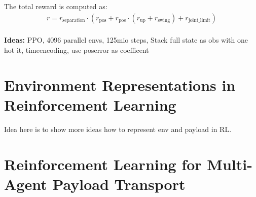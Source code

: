 The total reward is computed as:
\begin{equation}
    \begin{split}
r = r_{\text{separation}} \cdot \left( r_{\text{pos}} + r_{\text{pos}} \cdot (r_{\text{up}} + r_{\text{swing}}) + r_{\text{joint\_limit}} \right)
    \end{split}
\end{equation}
\\
\textbf{Ideas:}
 PPO, 4096 parallel envs, 125mio steps, Stack full state as obs with one hot it, timeencoding, use poserror as coefficent\\


\section{Environment Representations in Reinforcement Learning}
Idea here is to show more ideas how to represent env and payload in RL.
\section{Reinforcement Learning for Multi-Agent Payload Transport}
